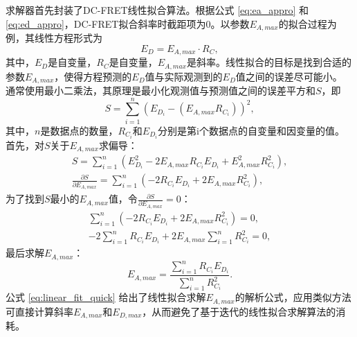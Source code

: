 求解器首先封装了DC-FRET线性拟合算法。根据公式 \ref{eq:ea_appro} 和 \ref{eq:ed_appro}，DC-FRET拟合斜率时截距项为0。以参数$E_{A,max}$的拟合过程为例，其线性方程形式为
\begin{equation}
    E_D = E_{A,max}\cdot R_C ,
\end{equation}
其中，$E_D$是自变量，$R_C$是自变量，$E_{A,max}$是斜率。线性拟合的目标是找到合适的参数$E_{A,max}$，使得方程预测的$E_D$值与实际观测到的$E_D$值之间的误差尽可能小。
通常使用最小二乘法，其原理是最小化观测值与预测值之间的误差平方和$S$，即
\begin{equation}
    S=\sum^{n}_{i=1}(E_{D_i}-(E_{A,max}R_{C_i}))^2 ,
\end{equation}
其中，$n$是数据点的数量，$R_{C_i}$和$E_{D_i}$分别是第i个数据点的自变量和因变量的值。
首先，对$S$关于$E_{A,max}$求偏导：
\begin{align}
      S=\sum_{i = 1}^{n}(E_{D_i}^{2}-2E_{A,max}R_{C_i}E_{D_i} + E_{A,max}^{2}R_{C_i}^{2}), \\
      \frac{\partial S}{\partial E_{A,max}}=\sum_{i = 1}^{n}(-2R_{C_i}E_{D_i} + 2E_{A,max}R_{C_i}^{2}),
\end{align}
为了找到$S$最小的$E_{A,max}$值，令$\frac{\partial S}{\partial E_{A,max}}=0$：
\begin{align}
      \sum_{i = 1}^{n}(-2R_{C_i}E_{D_i} + 2E_{A,max}R_{C_i}^{2}) = 0, \\
    -2\sum_{i = 1}^{n}R_{C_i}E_{D_i}+2E_{A,max}\sum_{i = 1}^{n}R_{C_i}^{2}=0,
\end{align}
最后求解$E_{A,max}$：
\begin{equation}
        E_{A,max}=\frac{\sum_{i = 1}^{n}R_{C_i}E_{D_i}}{\sum_{i = 1}^{n}R_{C_i}^{2}}. \label{eq:linear_fit_quick}
\end{equation}
公式 \ref{eq:linear_fit_quick} 给出了线性拟合求解$E_{A,max}$的解析公式，应用类似方法可直接计算斜率$E_{A,max}$和$E_{D,max}$，从而避免了基于迭代的线性拟合求解算法的消耗。

